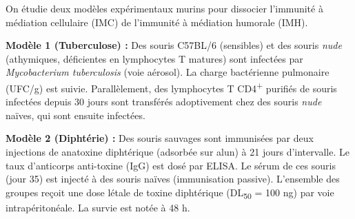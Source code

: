 \documentclass[11pt]{article}
\begin{document}
\begin{exercice}
On étudie deux modèles expérimentaux murins pour dissocier l'immunité à médiation cellulaire (IMC) de l'immunité à médiation humorale (IMH).

\textbf{Modèle 1 (Tuberculose) :} Des souris C57BL/6 (sensibles) et des souris \textit{nude} (athymiques, déficientes en lymphocytes T matures) sont infectées par \textit{Mycobacterium tuberculosis} (voie aérosol). La charge bactérienne pulmonaire (UFC/g) est suivie. Parallèlement, des lymphocytes T CD4\textsuperscript{+} purifiés de souris infectées depuis 30 jours sont transférés adoptivement chez des souris \textit{nude} naïves, qui sont ensuite infectées.

\textbf{Modèle 2 (Diphtérie) :} Des souris sauvages sont immunisées par deux injections de anatoxine diphtérique (adsorbée sur alun) à 21 jours d'intervalle. Le taux d'anticorps anti-toxine (IgG) est dosé par ELISA. Le sérum de ces souris (jour 35) est injecté à des souris naïves (immunisation passive). L'ensemble des groupes reçoit une dose létale de toxine diphtérique (DL\textsubscript{50} = 100 ng) par voie intrapéritonéale. La survie est notée à 48 h.


\end{exercice}
\end{document}
